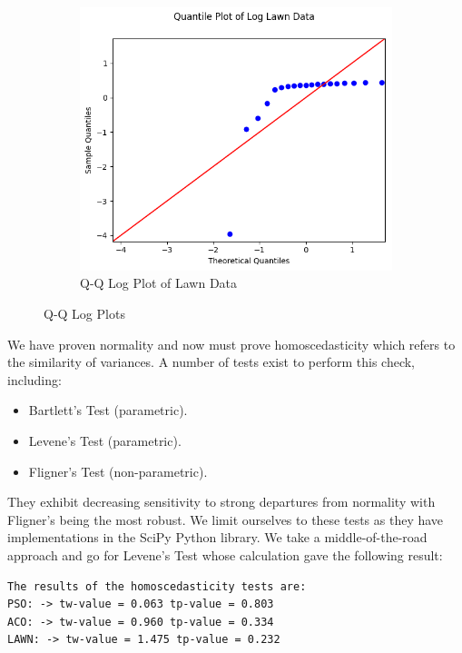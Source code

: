 \documentclass{report}
\begin{document}
\begin{figure}[H]
\begin{subfigure}[h]{0.4\textwidth}
	\end{subfigure}
	~
	\begin{subfigure}[h]{0.4\textwidth}
		\centering
		\includegraphics[width=\textwidth]{images/lawn_log_qq}
		\caption{Q-Q Log Plot of Lawn Data}
		\label{fig:qqloglawn}
	\end{subfigure}
	\caption{Q-Q Log Plots}
	\label{fig:qqlogplot}
\end{figure}

We have proven normality and now must prove homoscedasticity which refers to the similarity of variances. A number of tests exist to perform this check, including:
\begin{itemize}
	\item Bartlett's Test (parametric).
	\item Levene's Test (parametric).
	\item Fligner's Test (non-parametric).
\end{itemize}

They exhibit decreasing sensitivity to strong departures from normality with Fligner's being the most robust. We limit ourselves to these tests as they have implementations in the SciPy Python library. We take a middle-of-the-road approach and go for Levene's Test whose calculation gave the following result:

\begin{Verbatim}[commandchars=\\\{\}]
The results of the homoscedasticity tests are: 
PSO: -> tw-value = 0.063 tp-value = 0.803 
ACO: -> tw-value = 0.960 tp-value = 0.334 
LAWN: -> tw-value = 1.475 tp-value = 0.232

\end{Verbatim}
\end{document}
